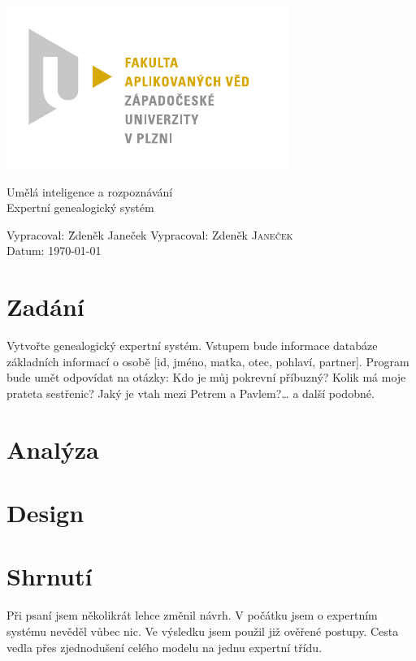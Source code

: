 \documentclass[a4paper, 12pt]{article}
\begin{document}
\begin{titlepage}
\includegraphics[bb=0 0 167 96]{fav_cmyk.pdf}
\vfill
\begin{center}
{\huge Umělá inteligence a rozpoznávání}\\[3ex]
{\Large Expertní genealogický systém}
\end{center}
\vfill
\begin{tabbing}
Vypracoval: \hspace{1ex}\=Zdeněk Janeček\kill
Vypracoval: \>Zdeněk \textsc{Janeček}\\[1ex]
Datum:\> \today
\end{tabbing}
\end{titlepage}

\tableofcontents

\section{Zadání}
Vytvořte genealogický expertní systém. Vstupem bude informace databáze
základních informací o osobě [id, jméno, matka, otec, pohlaví, partner].
Program bude umět odpovídat na otázky: Kdo je můj pokrevní příbuzný?
Kolik má moje prateta sestřenic? Jaký je vtah mezi Petrem a Pavlem?\ldots
a další podobné.

\section{Analýza}

\section{Design}

\section{Shrnutí}
Při psaní jsem několikrát lehce změnil návrh. V počátku jsem o expertním
systému nevěděl vůbec nic. Ve výsledku jsem použil již ověřené postupy.
Cesta vedla přes zjednodušení celého modelu na jednu expertní třídu.
\end{document}

